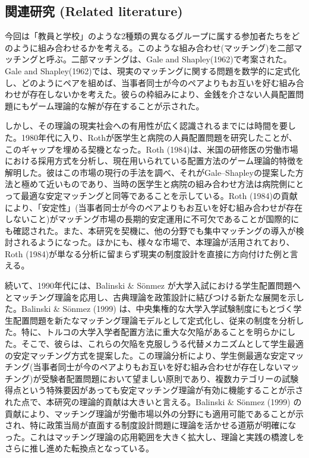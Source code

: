 \documentclass[12pt, a4paper]{article}
\theoremstyle{definition}
\theoremstyle{remark}
\theoremstyle{plain}
\begin{document}
\subsection{関連研究 (Related literature)}



今回は「教員と学校」のような2種類の異なるグループに属する参加者たちをどのように組み合わせるかを考える。このような組み合わせ(マッチング)を二部マッチングと呼ぶ。二部マッチングは、Gale and Shapley(1962)で考案された。Gale and Shapley(1962)では、現実のマッチングに関する問題を数学的に定式化し、どのようにペアを組めば、当事者同士が今のペアよりもお互いを好む組み合わせが存在しないかを考えた。彼らの枠組みにより、金銭を介さない人員配置問題にもゲーム理論的な解が存在することが示された。

しかし、その理論の現実社会への有用性が広く認識されるまでには時間を要した。1980年代に入り、Rothが医学生と病院の人員配置問題を研究したことが、このギャップを埋める契機となった。Roth (1984)は、米国の研修医の労働市場における採用方式を分析し、現在用いられている配置方法のゲーム理論的特徴を解明した。彼はこの市場の現行の手法を調べ、それがGale–Shapleyの提案した方法と極めて近いものであり、当時の医学生と病院の組み合わせ方法は病院側にとって最適な安定マッチングと同等であることを示している。Roth (1984)の貢献により、「安定性」(当事者同士が今のペアよりもお互いを好む組み合わせが存在しないこと)がマッチング市場の長期的安定運用に不可欠であることが国際的にも確認された。また、本研究を契機に、他の分野でも集中マッチングの導入が検討されるようになった。ほかにも、様々な市場で、本理論が活用されており、Roth (1984)が単なる分析に留まらず現実の制度設計を直接に方向付けた例と言える。

続いて、1990年代には、Balinski $\&$ S\"onmez が大学入試における学生配置問題へとマッチング理論を応用し、古典理論を政策設計に結びつける新たな展開を示した。Balinski $\&$ S\"onmez (1999) は、中央集権的な大学入学試験制度にもとづく学生配置問題を新たなマッチング理論モデルとして定式化し、従来の制度を分析した。特に、トルコの大学入学者配置方法に重大な欠陥があることを明らかにした。そこで、彼らは、これらの欠陥を克服しうる代替メカニズムとして学生最適の安定マッチング方式を提案した。この理論分析により、学生側最適な安定マッチング(当事者同士が今のペアよりもお互いを好む組み合わせが存在しないマッチング)が受験者配置問題において望ましい原則であり、複数カテゴリーの試験得点という特殊要因があっても安定マッチング理論が有効に機能することが示された点で、本研究の理論的貢献は大きいと言える。Balinski $\&$ S\"onmez (1999) の貢献により、マッチング理論が労働市場以外の分野にも適用可能であることが示され、特に政策当局が直面する制度設計問題に理論を活かせる道筋が明確になった。これはマッチング理論の応用範囲を大きく拡大し、理論と実践の橋渡しをさらに推し進めた転換点となっている。
\end{document}
